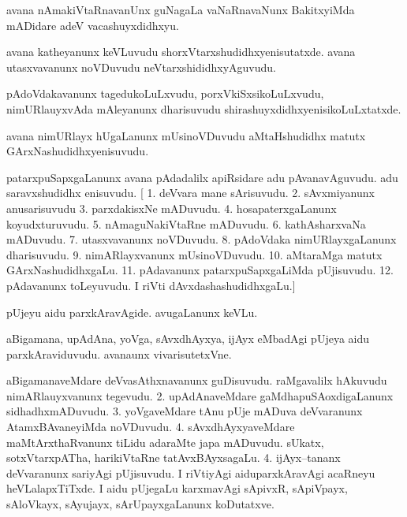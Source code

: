 \documentclass{article}
\begin{document}
\begin{mn}%
avana nAmakiVtaRnavanUnx guNagaLa vaNaRnavaNunx BakitxyiMda mADidare adeV vacashuyxdidhxyu.
\end{mn}

\begin{mn}%
avana katheyanunx keVLuvudu shorxVtarxshudidhxyenisutatxde. avana utasxvavanunx noVDuvudu 
neVtarxshididhxyAguvudu.
\end{mn}

\begin{mn}%
pAdoVdakavanunx tagedukoLuLxvudu, porxVkiSxsikoLuLxvudu, nimURlauyxvAda mAleyanunx 
dharisuvudu shirashuyxdidhxyenisikoLuLxtatxde.
\end{mn}

\begin{mn}%
avana nimURlayx hUgaLanunx mUsinoVDuvudu aMtaHshudidhx matutx GArxNashudidhxyenisuvudu.
\end{mn}

\begin{mn}%
patarxpuSapxgaLanunx avana pAdadalilx apiRsidare adu pAvanavAguvudu. adu saravxshudidhx 
enisuvudu.
[ 1. deVvara mane sArisuvudu. 2. sAvxmiyanunx anusarisuvudu 3. parxdakisxNe mADuvudu. 4. 
hosapaterxgaLanunx koyudxturuvudu. 5. nAmaguNakiVtaRne mADuvudu. 6. kathAsharxvaNa 
mADuvudu. 7. utasxvavanunx noVDuvudu. 8. pAdoVdaka nimURlayxgaLanunx dharisuvudu. 9. 
nimARlayxvanunx mUsinoVDuvudu. 10. aMtaraMga matutx GArxNashudidhxgaLu. 11. pAdavanunx 
patarxpuSapxgaLiMda pUjisuvudu. 12. pAdavanunx toLeyuvudu. I riVti dAvxdashashudidhxgaLu.]
\end{mn}

\begin{mn}%
pUjeyu aidu parxkAravAgide. avugaLanunx keVLu. 
\end{mn}

\begin{mn}%
aBigamana, upAdAna, yoVga, sAvxdhAyxya, ijAyx eMbadAgi pUjeya aidu parxkAraviduvudu. 
avanaunx vivarisutetxVne.
\end{mn}

\begin{mn}%
aBigamanaveMdare deVvasAthxnavanunx guDisuvudu. raMgavalilx hAkuvudu nimARlauyxvanunx 
tegevudu. 2. upAdAnaveMdare gaMdhapuSAoxdigaLanunx sidhadhxmADuvudu. 3. yoVgaveMdare tAnu 
pUje mADuva deVvaranunx AtamxBAvaneyiMda noVDuvudu. 4. sAvxdhAyxyaveMdare 
maMtArxthaRvanunx tiLidu adaraMte japa mADuvudu. sUkatx, sotxVtarxpATha, harikiVtaRne 
tatAvxBAyxsagaLu. 4. ijAyx--tananx deVvaranunx sariyAgi pUjisuvudu. I riVtiyAgi 
aiduparxkAravAgi acaRneyu heVLalapxTiTxde. I aidu pUjegaLu karxmavAgi sApivxR, sApiVpayx, 
sAloVkayx, sAyujayx, sArUpayxgaLanunx koDutatxve.
\end{mn}
\end{document}
